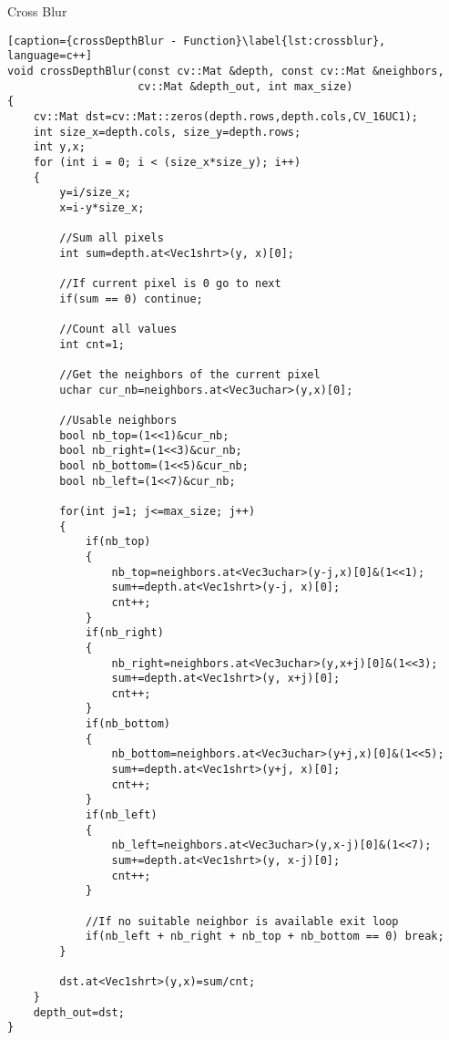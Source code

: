 \begin{algorithm}[H]

	\begin{algorithmic}
	
		\EndIf
		\EndIf
		\EndIf
		\EndIf 
	\EndFor
\EndFor

	\end{algorithmic}
 \caption{Cross Blur}
 \label{alg:crossblur}
\end{algorithm}



\begin{lstlisting}[caption={crossDepthBlur - Function}\label{lst:crossblur}, language=c++]
void crossDepthBlur(const cv::Mat &depth, const cv::Mat &neighbors, 
                    cv::Mat &depth_out, int max_size)
{
	cv::Mat dst=cv::Mat::zeros(depth.rows,depth.cols,CV_16UC1);
	int size_x=depth.cols, size_y=depth.rows;
	int y,x;
	for (int i = 0; i < (size_x*size_y); i++)
	{
		y=i/size_x;
		x=i-y*size_x;

		//Sum all pixels
		int sum=depth.at<Vec1shrt>(y, x)[0];

		//If current pixel is 0 go to next
		if(sum == 0) continue;

		//Count all values
		int cnt=1;

		//Get the neighbors of the current pixel
		uchar cur_nb=neighbors.at<Vec3uchar>(y,x)[0];

		//Usable neighbors
		bool nb_top=(1<<1)&cur_nb;
		bool nb_right=(1<<3)&cur_nb;
		bool nb_bottom=(1<<5)&cur_nb;
		bool nb_left=(1<<7)&cur_nb;

		for(int j=1; j<=max_size; j++)
		{
			if(nb_top)
			{
				nb_top=neighbors.at<Vec3uchar>(y-j,x)[0]&(1<<1);
				sum+=depth.at<Vec1shrt>(y-j, x)[0];
				cnt++;
			}
			if(nb_right)
			{
				nb_right=neighbors.at<Vec3uchar>(y,x+j)[0]&(1<<3);
				sum+=depth.at<Vec1shrt>(y, x+j)[0];
				cnt++;
			}
			if(nb_bottom)
			{
				nb_bottom=neighbors.at<Vec3uchar>(y+j,x)[0]&(1<<5);
				sum+=depth.at<Vec1shrt>(y+j, x)[0];
				cnt++;
			}
			if(nb_left)
			{
				nb_left=neighbors.at<Vec3uchar>(y,x-j)[0]&(1<<7);
				sum+=depth.at<Vec1shrt>(y, x-j)[0];
				cnt++;
			}

			//If no suitable neighbor is available exit loop
			if(nb_left + nb_right + nb_top + nb_bottom == 0) break;
		}

		dst.at<Vec1shrt>(y,x)=sum/cnt;
	}
	depth_out=dst;
}
\end{lstlisting}

